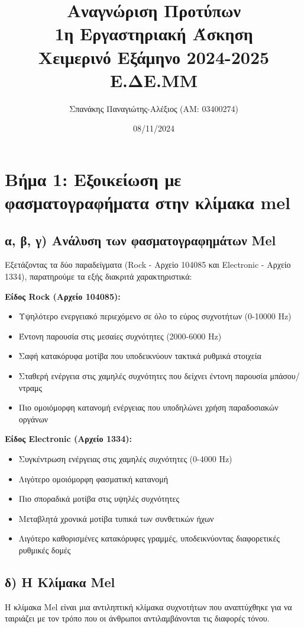 \documentclass[a4paper,12pt]{article}
\title{Αναγνώριση Προτύπων \\ 1η Εργαστηριακή Άσκηση \\ Χειμερινό Εξάμηνο 2024-2025 \\ Ε.ΔE.ΜΜ}
\author{Σπανάκης Παναγιώτης-Αλέξιος (ΑΜ: 03400274)}
\date{08/11/2024}
\begin{document}
\maketitle

\section*{Βήμα 1: Εξοικείωση με φασματογραφήματα στην κλίμακα mel}

\subsection*{α, β, γ) Ανάλυση των φασματογραφημάτων Mel}
Εξετάζοντας τα δύο παραδείγματα (Rock - Αρχείο 104085 και Electronic - Αρχείο 1334), παρατηρούμε τα εξής διακριτά χαρακτηριστικά:

\textbf{Είδος Rock (Αρχείο 104085):}
\begin{itemize}
    \item Υψηλότερο ενεργειακό περιεχόμενο σε όλο το εύρος συχνοτήτων (0-10000 Hz)
    \item Έντονη παρουσία στις μεσαίες συχνότητες (2000-6000 Hz)
    \item Σαφή κατακόρυφα μοτίβα που υποδεικνύουν τακτικά ρυθμικά στοιχεία
    \item Σταθερή ενέργεια στις χαμηλές συχνότητες που δείχνει έντονη παρουσία μπάσου/ντραμς
    \item Πιο ομοιόμορφη κατανομή ενέργειας που υποδηλώνει χρήση παραδοσιακών οργάνων
\end{itemize}

\textbf{Είδος Electronic (Αρχείο 1334):}
\begin{itemize}
    \item Συγκέντρωση ενέργειας στις χαμηλές συχνότητες (0-4000 Hz)
    \item Λιγότερο ομοιόμορφη φασματική κατανομή
    \item Πιο σποραδικά μοτίβα στις υψηλές συχνότητες
    \item Μεταβλητά χρονικά μοτίβα τυπικά των συνθετικών ήχων
    \item Λιγότερο καθορισμένες κατακόρυφες γραμμές, υποδεικνύοντας διαφορετικές ρυθμικές δομές
\end{itemize}

\subsection*{δ) Η Κλίμακα Mel}
Η κλίμακα Mel είναι μια αντιληπτική κλίμακα συχνοτήτων που αναπτύχθηκε για να ταιριάζει με τον τρόπο που οι άνθρωποι αντιλαμβάνονται τις διαφορές τόνου.
\end{document}
